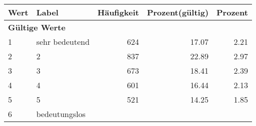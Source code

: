      \begin{longtable}{lXrrr}
     \toprule
     \textbf{Wert} & \textbf{Label} & \textbf{Häufigkeit} & \textbf{Prozent(gültig)} & \textbf{Prozent} \\
     \endhead
     \midrule
     \multicolumn{5}{l}{\textbf{Gültige Werte}}\\

     1 &
     \multicolumn{1}{X}{ sehr bedeutend   } &


       \num{624} &
       \num[round-mode=places,round-precision=2]{17.07} &
         \num[round-mode=places,round-precision=2]{2.21} \\

     2 &
     \multicolumn{1}{X}{ 2   } &


       \num{837} &
       \num[round-mode=places,round-precision=2]{22.89} &
         \num[round-mode=places,round-precision=2]{2.97} \\

     3 &
     \multicolumn{1}{X}{ 3   } &


       \num{673} &
       \num[round-mode=places,round-precision=2]{18.41} &
         \num[round-mode=places,round-precision=2]{2.39} \\

     4 &
     \multicolumn{1}{X}{ 4   } &


       \num{601} &
       \num[round-mode=places,round-precision=2]{16.44} &
         \num[round-mode=places,round-precision=2]{2.13} \\

     5 &
     \multicolumn{1}{X}{ 5   } &


       \num{521} &
       \num[round-mode=places,round-precision=2]{14.25} &
         \num[round-mode=places,round-precision=2]{1.85} \\

     6 &
     \multicolumn{1}{X}{ bedeutungslos   } &



\end{longtable}
